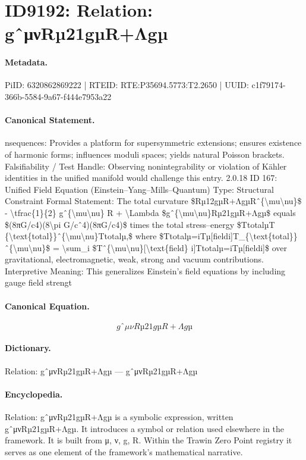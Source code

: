 \section*{ID9192: Relation: gˆμνRµ21gµR+Λgµ}
\paragraph{Metadata.}
PiID: 6320862869222 | RTEID: RTE:P35694.5773:T2.2650 | UUID: c1f79174-366b-5584-9a67-f444e7953a22

\paragraph{Canonical Statement.}
nsequences: Provides a platform for supersymmetric extensions; ensures existence of harmonic forms; influences moduli spaces; yields natural Poisson brackets. Falsifiability / Test Handle: Observing nonintegrability or violation of Kähler identities in the unified manifold would challenge this entry. 2.0.18 ID 167: Unified Field Equation (Einstein–Yang–Mills–Quantum) Type: Structural Constraint Formal Statement: The total curvature \$Rµ12gµR+ΛgµRˆ\{\textbackslash{}mu\textbackslash{}nu\}\$ - \textbackslash{}tfrac\{1\}\{2\} gˆ\{\textbackslash{}mu\textbackslash{}nu\} R + \textbackslash{}Lambda \$gˆ\{\textbackslash{}mu\textbackslash{}nu\}Rµ21gµR+Λgµ\$ equals \$(8πG/c4)(8\textbackslash{}pi G/cˆ4)(8πG/c4)\$ times the total stress–energy \$TtotalµT \{\textbackslash{}text\{total\}\}ˆ\{\textbackslash{}mu\textbackslash{}nu\}Ttotalµ,\$ where \$Ttotalµ=iTµ[fieldi]T\_\{\textbackslash{}text\{total\}\}ˆ\{\textbackslash{}mu\textbackslash{}nu\}\$ = \textbackslash{}sum\_i \$Tˆ\{\textbackslash{}mu\textbackslash{}nu\}[\textbackslash{}text\{field\} i]Ttotalµ=iTµ[fieldi]\$ over gravitational, electromagnetic, weak, strong and vacuum contributions. Interpretive Meaning: This generalizes Einstein’s field equations by including gauge field strengt

\paragraph{Canonical Equation.}
\[
gˆ{\mu\nu}Rµ21gµR+Λgµ
\]

\paragraph{Dictionary.}
Relation: gˆμνRµ21gµR+Λgµ — gˆμνRµ21gµR+Λgµ

\paragraph{Encyclopedia.}
Relation: gˆμνRµ21gµR+Λgµ is a symbolic expression, written gˆμνRµ21gµR+Λgµ. It introduces a symbol or relation used elsewhere in the framework. It is built from μ, ν, g, R. Within the Trawin Zero Point registry it serves as one element of the framework's mathematical narrative.
